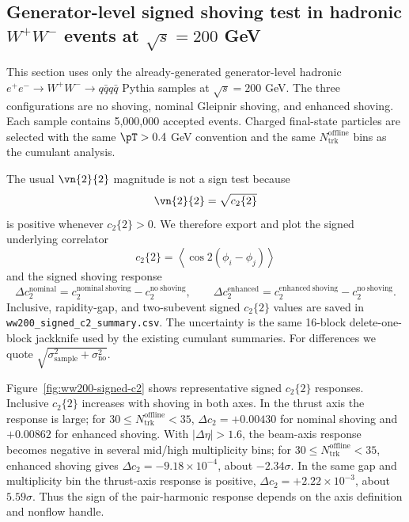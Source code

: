 \subsection{Generator-level signed shoving test in hadronic \(W^+W^-\) events at \(\sqrt{s}=200\) GeV}
\label{subsec:ww200-signed-generator-test}

This section uses only the already-generated generator-level hadronic
\(e^+e^-\to W^+W^-\to q\bar q q\bar q\) Pythia samples at
\(\sqrt{s}=200\) GeV.  The three configurations are no shoving, nominal
Gleipnir shoving, and enhanced shoving.  Each sample contains 5,000,000
accepted events.  Charged final-state particles are selected with the same
\(\pT>0.4\) GeV convention and the same \(N_{\mathrm{trk}}^{\mathrm{offline}}\)
bins as the cumulant analysis.

The usual \(\vn{2}{2}\) magnitude is not a sign test because
\[
  \vn{2}{2} = \sqrt{c_2\{2\}}
\]
is positive whenever \(c_2\{2\}>0\).  We therefore export and plot the signed
underlying correlator
\[
  c_2\{2\}=\left\langle \cos 2(\phi_i-\phi_j)\right\rangle
\]
and the signed shoving response
\[
  \Delta c_2^{\mathrm{nominal}} =
  c_2^{\mathrm{nominal\ shoving}}-c_2^{\mathrm{no\ shoving}},\qquad
  \Delta c_2^{\mathrm{enhanced}} =
  c_2^{\mathrm{enhanced\ shoving}}-c_2^{\mathrm{no\ shoving}}.
\]
Inclusive, rapidity-gap, and two-subevent signed \(c_2\{2\}\) values are saved
in \texttt{ww200\_signed\_c2\_summary.csv}.  The uncertainty is the same
16-block delete-one-block jackknife used by the existing cumulant summaries.
For differences we quote
\(\sqrt{\sigma_{\mathrm{sample}}^2+\sigma_{\mathrm{no}}^2}\).

Figure~\ref{fig:ww200-signed-c2} shows representative signed \(c_2\{2\}\)
responses.  Inclusive \(c_2\{2\}\) increases with shoving in both axes.  In the
thrust axis the response is large; for \(30\leq N_{\mathrm{trk}}^{\mathrm{offline}}<35\),
\(\Delta c_2=+0.00430\) for nominal shoving and \(+0.00862\) for enhanced
shoving.  With \(|\Delta\eta|>1.6\), the beam-axis response becomes negative in
several mid/high multiplicity bins; for \(30\leq N_{\mathrm{trk}}^{\mathrm{offline}}<35\),
enhanced shoving gives \(\Delta c_2=-9.18\times 10^{-4}\), about
\(-2.34\sigma\).  In the same gap and multiplicity bin the thrust-axis response
is positive, \(\Delta c_2=+2.22\times 10^{-3}\), about \(5.59\sigma\).  Thus the
sign of the pair-harmonic response depends on the axis definition and nonflow
handle.

